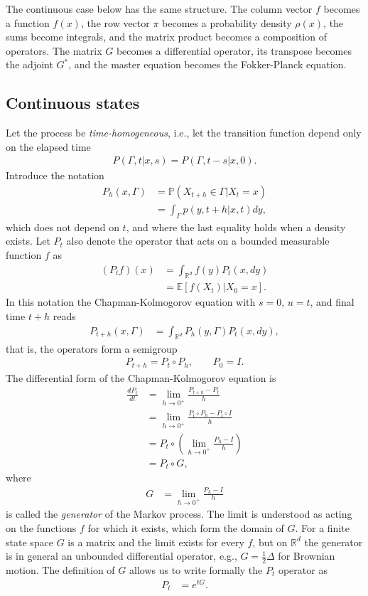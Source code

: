 \documentclass[11pt]{article}
\begin{document}
The continuous case below has the same structure. The column vector $f$ becomes a function $f(x)$, the row vector $\pi$ becomes a probability density $\rho(x)$, the sums become integrals, and the matrix product becomes a composition of operators. The matrix $G$ becomes a differential operator, its transpose becomes the adjoint $G^*$, and the master equation becomes the Fokker-Planck equation.

\subsection{Continuous states}
Let the process be {\it time-homogeneous}, i.e., let the transition function depend only on the elapsed time
\begin{align}
  P(\Gamma,t|x,s)=P(\Gamma,t-s|x,0).
\end{align}
Introduce the notation
\begin{align}
  P_h(x,\Gamma)&=\mathbb{P}(X_{t+h}\in\Gamma|X_t=x)\nonumber\\
  &=\int_{\Gamma}p(y,t+h|x,t)dy,
\end{align}
which does not depend on $t$, and where the last equality holds when a density exists. Let $P_t$ also denote the operator that acts on a bounded measurable function $f$ as
\begin{align}
  (P_tf)(x)&=\int_{\mathbb{R}^d}f(y)P_t(x,dy)\nonumber\\
  &=\mathbb{E}[f(X_t)|X_0=x].
\end{align}
In this notation the Chapman-Kolmogorov equation with $s=0$, $u=t$, and final time $t+h$ reads
\begin{align}
  P_{t+h}(x,\Gamma)&=\int_{\mathbb{R}^d}P_h(y,\Gamma)P_t(x,dy),
\end{align}
that is, the operators form a semigroup
\begin{align}
  P_{t+h}=P_t\circ P_h,\qquad P_0=I.
\end{align}
The differential form of the Chapman-Kolmogorov equation is
\begin{align}
  \frac{dP_t}{dt}&=\lim_{h\rightarrow 0^+}\frac{P_{t+h}-P_t}{h}\nonumber\\
  &=\lim_{h\rightarrow 0^+}\frac{P_t\circ P_h-P_t\circ I}{h}\nonumber\\
  &=P_t\circ\left(\lim_{h\rightarrow 0^+}\frac{P_h-I}{h}\right)\nonumber\\
  &=P_t\circ G,
\end{align}
where
\begin{align}
  G&=\lim_{h\rightarrow 0^+}\frac{P_h-I}{h}
\end{align}
is called the {\it generator} of the Markov process. The limit is understood as acting on the functions $f$ for which it exists, which form the domain of $G$. For a finite state space $G$ is a matrix and the limit exists for every $f$, but on $\mathbb{R}^d$ the generator is in general an unbounded differential operator, e.g., $G=\frac{1}{2}\Delta$ for Brownian motion. The definition of $G$ allows us to write formally the $P_t$ operator as
\begin{align}
  P_t&=e^{tG}.
\end{align}
\end{document}
